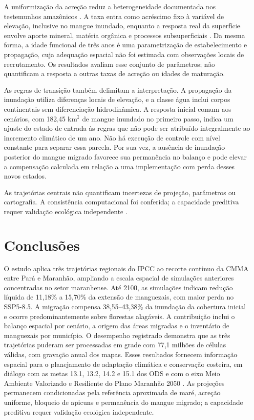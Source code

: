 \documentclass[12pt,a4paper]{article}
\begin{document}
A uniformização da acreção reduz a heterogeneidade documentada nos testemunhos amazônicos \citep{lacerda2024,passos2023}. A taxa entra como acréscimo fixo à variável de elevação, inclusive no mangue inundado, enquanto a resposta real da superfície envolve aporte mineral, matéria orgânica e processos subsuperficiais \citep{woodroffe2016}. Da mesma forma, a idade funcional de três anos é uma parametrização de estabelecimento e propagação, cuja adequação espacial não foi estimada com observações locais de recrutamento. Os resultados avaliam esse conjunto de parâmetros; não quantificam a resposta a outras taxas de acreção ou idades de maturação.

As regras de transição também delimitam a interpretação. A propagação da inundação utiliza diferenças locais de elevação, e a classe água inclui corpos continentais sem diferenciação hidrodinâmica. A resposta inicial comum aos cenários, com 182,45 km$^2$ de mangue inundado no primeiro passo, indica um ajuste do estado de entrada às regras que não pode ser atribuído integralmente ao incremento climático de um ano. Não há execução de controle com nível constante para separar essa parcela. Por sua vez, a ausência de inundação posterior do mangue migrado favorece sua permanência no balanço e pode elevar a compensação calculada em relação a uma implementação com perda desses novos estados.

As trajetórias centrais não quantificam incertezas de projeção, parâmetros ou cartografia. A consistência computacional foi conferida; a capacidade preditiva requer validação ecológica independente \citep{olofsson2014}.

\section{Conclusões}
O estudo aplica três trajetórias regionais do IPCC ao recorte contínuo da CMMA entre Pará e Maranhão, ampliando a escala espacial de simulações anteriores concentradas no setor maranhense. Até 2100, as simulações indicam redução líquida de 11,18\% a 15,70\% da extensão de manguezais, com maior perda no SSP5-8.5. A migração compensa 38,55--43,38\% da inundação da cobertura inicial e ocorre predominantemente sobre florestas alagáveis. A contribuição inclui o balanço espacial por cenário, a origem das áreas migradas e o inventário de manguezais por município. O desempenho registrado demonstra que as três trajetórias puderam ser processadas em grade com 77,1 milhões de células válidas, com gravação anual dos mapas. Esses resultados fornecem informação espacial para o planejamento de adaptação climática e conservação costeira, em diálogo com as metas 13.1, 13.2, 14.2 e 15.1 dos ODS e com o eixo Meio Ambiente Valorizado e Resiliente do Plano Maranhão 2050 \citep{unitednations2015,maranhao2050}. As projeções permanecem condicionadas pela referência aproximada de maré, acreção uniforme, bloqueio de apicuns e permanência do mangue migrado; a capacidade preditiva requer validação ecológica independente.
\end{document}
